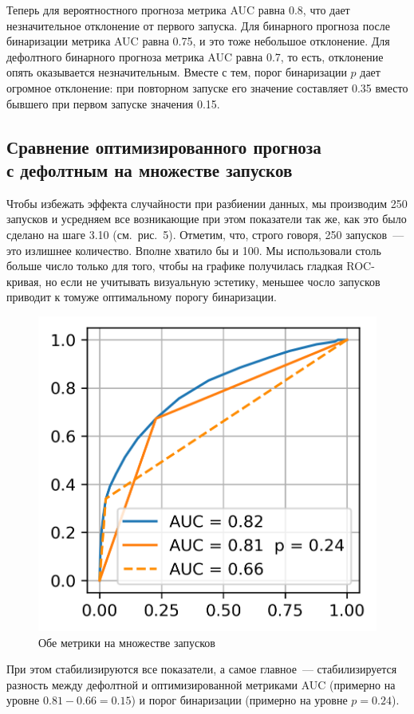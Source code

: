 Теперь для вероятностного прогноза метрика AUC равна 0.8, что дает незначительное отклонение от первого запуска. Для бинарного прогноза после бинаризации метрика AUC равна 0.75, и это тоже небольшое отклонение. Для дефолтного бинарного прогноза метрика AUC равна 0.7, то есть, отклонение опять оказывается незначительным. Вместе с тем, порог бинаризации $p$ дает огромное отклонение: при повторном запуске его значение составляет 0.35 вместо бывшего при первом запуске значения 0.15.

\subsection{Сравнение оптимизированного прогноза\\ с дефолтным на множестве запусков}
Чтобы избежать эффекта случайности при разбиении данных, мы производим 250 запусков и усредняем все возникающие при этом показатели так же, как это было сделано на шаге 3.10 (см. рис. 5). Отметим, что, строго говоря, 250 запусков~--- это излишнее количество. Вполне хватило бы и 100. Мы использовали столь больше число только для того, чтобы на графике получилась гладкая ROC-кривая, но если не учитывать визуальную эстетику, меньшее чосло запусков приводит к томуже оптимальному порогу бинаризации.

\begin{figure}[!htb]
	\centering
	\begin{minipage}{0.32\textwidth}
		\includegraphics[width=\linewidth]{pictures/Обе метрики на множестве запусков}
	\end{minipage}
	\caption{Обе метрики на множестве запусков}
\end{figure}

При этом стабилизируются все показатели, а самое главное~---  стабилизируется разность между дефолтной и оптимизированной метриками AUC (примерно на уровне $0.81 - 0.66 = 0.15$) и порог бинаризации (примерно на уровне $p = 0.24$).
